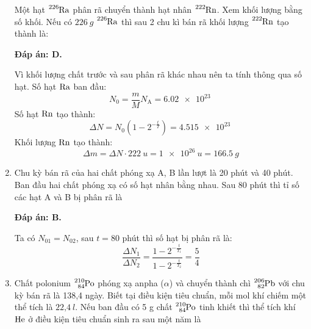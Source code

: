 \begin{enumerate}[label=\bfseries Câu \arabic*:]
\cauhoi
{Một hạt $\ce{^{226} Ra}$ phân rã chuyển thành hạt nhân $\ce{^{222} Rn}$. Xem khối lượng bằng số khối. Nếu có $\SI{226}{g}$ $\ce{^{226} Ra}$ thì sau 2 chu kì bán rã khối lượng $\ce{^{222} Rn}$ tạo thành là:
}

\loigiai
{		\textbf{Đáp án: D.}

Vì khối lượng chất trước và sau phân rã khác nhau nên ta tính thông qua số hạt.
Số hạt $\ce{Ra}$ ban đầu:
$$N_0 = \dfrac{m}{M} N_\text{A} = \SI{6.02e23}{}$$
Số hạt $\ce{Rn}$ tạo thành:
$$\Delta N = N_0 (1-2^{-\frac{t}{T}}) = \SI{4.515e23}{}$$
Khối lượng $\ce{Rn}$ tạo thành:
$$\Delta m = \Delta N \cdot \SI{222}{u} = \SI{1e26}{u} = \SI{166.5}{g}$$
}


	\item {}
	
	\cauhoi
	{Chu kỳ bán rã của hai chất phóng xạ A, B lần lượt là 20 phút và 40 phút. Ban đầu hai chất phóng xạ có số hạt nhân bằng nhau. Sau 80 phút thì tỉ số các hạt A và B bị phân rã là
	}
	
	\loigiai
	{		\textbf{Đáp án: B.}
		
		Ta có $N_{0 1} = N_{0 2}$, sau $t=80$ phút thì số hạt bị phân rã là:
		$$\dfrac{\Delta N_1}{\Delta N_2} = \dfrac{1-2^{-\frac{t}{T_1}}}{1-2^{-\frac{t}{T_2}}}=\dfrac{5}{4}$$
		
	}

	\item {}
	
	\cauhoi
	{Chất polonium $\ce{^{210}_{84} Po}$ phóng xạ anpha ($\alpha$) và chuyển thành chì $\ce{^{206}_{82} Pb}$ với chu kỳ bán rã là 138,4 ngày. Biết tại điều kiện tiêu chuẩn, mỗi mol khí chiếm một thể tích là $\text{22,4}\ l$. Nếu ban đầu có 5 g chất $\ce{^{210}_{84} Po}$ tinh khiết thì thể tích khí $\ce{He}$ ở điều kiện tiêu chuẩn sinh ra sau một năm là
		}
\end{enumerate}
